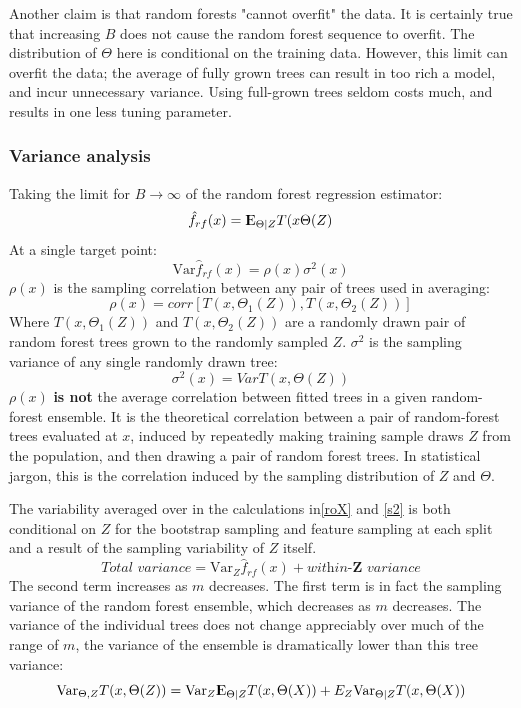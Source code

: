 \documentclass[12pt, letterpaper]{article}
\theoremstyle{definition}
\newcommand{\E}{{\rm I\kern-.3em E}}
\newcommand{\Var}{\mathrm{Var}}
\begin{document}
Another claim is that random forests "cannot overfit" the data. It is certainly true that increasing $B$ does not cause the random forest sequence to overfit. The distribution of $\Theta$ here is conditional on the training data. However, this limit can overfit the data; the average of fully grown trees can result in too rich a model, and incur unnecessary variance. Using full-grown trees seldom costs much, and results in one less tuning parameter.

\subsubsection{Variance analysis}
Taking the limit for $B\rightarrow \infty$ of the random forest regression estimator:
\begin{equation}
\hat{f}_{rf}(x) = \E_{\Theta|Z} T(x \Theta(Z)
\end{equation}
At a single target point:
\begin{equation}
\Var \hat{f}_{rf}(x)  =\rho(x) \sigma^2 (x)
\end{equation}
$\rho(x)$ is the sampling correlation between any pair of trees used in averaging:
\begin{equation}
\rho(x) = corr\left[ T(x,\Theta_1(Z)), T(x,\Theta_2(Z))\right]
\label{roX}
\end{equation}
Where $T(x,\Theta_1(Z))$ and $T(x,\Theta_2(Z))$ are a randomly drawn pair of random forest trees grown to the randomly sampled $Z$. $\sigma^2$ is the sampling variance of any single randomly drawn tree:
\begin{equation}
\sigma^2(x) = Var T(x, \Theta(Z))
\label{s2}
\end{equation}
$\rho(x)$ \textbf{is not} the average correlation between fitted trees in a given random-forest ensemble. It is the theoretical correlation between a pair of random-forest trees evaluated at $x$, induced by repeatedly making training sample draws $Z$ from the population, and then drawing a pair of random forest trees. In statistical jargon, this is the correlation induced by the sampling distribution of $Z$ and $\Theta$.

The variability averaged over in the calculations in\autoref{roX} and \autoref{s2} is both conditional on $Z$ for the bootstrap sampling and feature sampling at each split and a result of the sampling variability of $Z$ itself.
\begin{equation}
\textit{Total variance} = \Var_Z \hat{f}_{rf}(x) + \textit{within-$\mathbf{Z}$ variance}
\end{equation}
The second term increases as $m$ decreases. The first term is in fact the sampling variance of the random forest ensemble, which decreases as $m$ decreases. 
The variance of the individual trees does not change appreciably over much of the range of $m$, the variance of the ensemble is dramatically lower than this tree variance:
\begin{equation}
\Var_{\Theta,Z} T(x, \Theta(Z)) = \Var_Z \E_{\Theta|Z}T(x, \Theta(X)) + E_Z\Var_{\Theta|Z}T(x, \Theta(X))
\end{equation}
\end{document}
